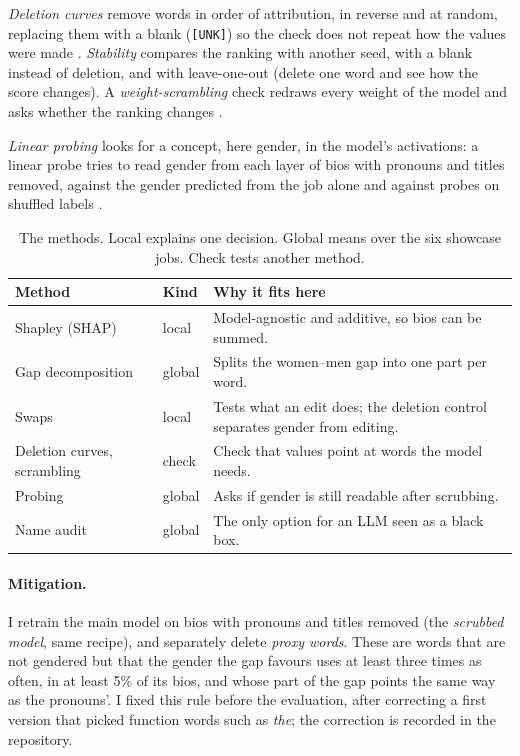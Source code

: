 \documentclass[11pt]{article}
\begin{document}
\emph{Deletion curves} remove words in order of attribution, in reverse and at random, replacing them with a blank (\texttt{[UNK]}) so the check does not repeat how the values were made \citep{samek2017evaluating}. \emph{Stability} compares the ranking with another seed, with a blank instead of deletion, and with leave-one-out (delete one word and see how the score changes). A \emph{weight-scrambling} check redraws every weight of the model and asks whether the ranking changes \citep{adebayo2018sanity}.

\emph{Linear probing} \citep{belinkov2022probing} looks for a concept, here gender, in the model's activations: a linear probe tries to read gender from each layer of bios with pronouns and titles removed, against the gender predicted from the job alone and against probes on shuffled labels \citep{hewitt2019designing}.

\begin{table}[!tbp]
\small
\begin{tabular}{@{}p{}p{}p{}@{}}
\toprule
Method & Kind & Why it fits here \\
\midrule
Shapley (SHAP) & local & Model-agnostic and additive, so bios can be summed. \\
Gap decomposition & global & Splits the women--men gap into one part per word. \\
Swaps & local & Tests what an edit does; the deletion control separates gender from editing. \\
Deletion curves, scrambling & check & Check that values point at words the model needs. \\
Probing & global & Asks if gender is still readable after scrubbing. \\
Name audit & global & The only option for an LLM seen as a black box. \\
\bottomrule
\end{tabular}
\caption{The methods. Local explains one decision. Global means over the six showcase jobs. Check tests another method.}
\label{tab:methods}
\end{table}

\paragraph{Mitigation.} I retrain the main model on bios with pronouns and titles removed (the \emph{scrubbed model}, same recipe), and separately delete \emph{proxy words}. These are words that are not gendered but that the gender the gap favours uses at least three times as often, in at least 5\% of its bios, and whose part of the gap points the same way as the pronouns'. I fixed this rule before the evaluation, after correcting a first version that picked function words such as \emph{the}; the correction is recorded in the repository.
\end{document}

